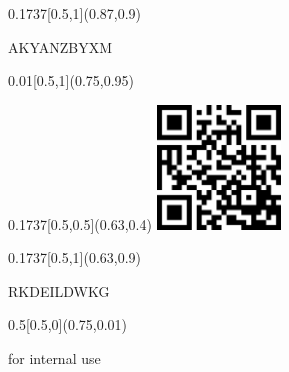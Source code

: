 \documentclass[a4paper]{article}
\begin{document}
\begin{textblock}{0.1737}[0.5,1](0.87,0.9)
  \begin{center}
    AKYANZBYXM
  \end{center}
\end{textblock}

\begin{textblock}{0.01}[0.5,1](0.75,0.95)
  \begin{center}
  \end{center}
\end{textblock}

\begin{textblock}{0.1737}[0.5,0.5](0.63,0.4)
  \includegraphics[width=3.3cm]{fig/main}
\end{textblock}

\begin{textblock}{0.1737}[0.5,1](0.63,0.9)
  \begin{center}
    RKDEILDWKG
  \end{center}
\end{textblock}

\begin{textblock}{0.5}[0.5,0](0.75,0.01)
  \begin{center} for internal use \end{center}
\end{textblock}
\end{document}
